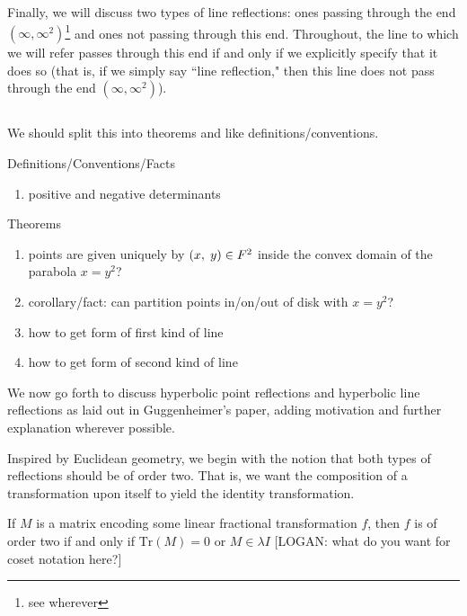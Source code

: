 \documentclass[12pt]{article}
\newcommand{\Tr}{\text{Tr}}
\newcommand{\ttc}{, \hspace{1mm}}
\theoremstyle{plain}
\theoremstyle{definition}
\begin{document}
Finally, we will discuss two types of line reflections: ones passing through the end $(\infty, \infty^2)$\footnote{see wherever} and ones not passing through this end. Throughout, the line to which we will refer passes through this end if and only if we explicitly specify that it does so (that is, if we simply say ``line reflection," then this line does not pass through the end $(\infty, \infty^2)$).








\[\]

We should split this into theorems and like definitions/conventions.

\noindent Definitions/Conventions/Facts
\begin{enumerate}[leftmargin = 4em, itemsep=-.8em]
	\item positive and negative determinants
\end{enumerate}

\noindent Theorems
\begin{enumerate}[leftmargin = 4em, itemsep=-.8em]
	\item points are given uniquely by $(x \ttc y) \in F^2$ inside the convex domain of the parabola $x = y^2$?
	\item corollary/fact: can partition points in/on/out of disk with $x=y^2$?
	\item how to get form of first kind of line
	\item how to get form of second kind of line
\end{enumerate}



We now go forth to discuss hyperbolic point reflections and hyperbolic line reflections as laid out in Guggenheimer's paper, adding motivation and further explanation wherever possible. 

Inspired by Euclidean geometry, we begin with the notion that both types of reflections should be of order two. That is, we want the composition of a transformation upon itself to yield the identity transformation. 

 If $M$ is a matrix encoding some linear fractional transformation $f$, then $f$ is of order two if and only if $\Tr(M) = 0$ or $M \in \lambda I$ [LOGAN: what do you want for coset notation here?]
\end{document}
